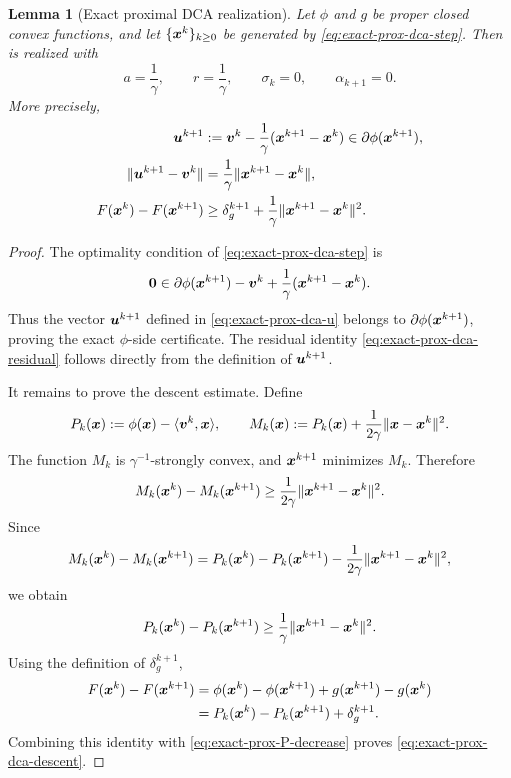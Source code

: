\documentclass[english]{article}
\newtheorem{lemma}{Lemma}[section]
\begin{document}
\begin{lemma}[Exact proximal DCA realization]
\label{lem:exact-prox-dca-realization}
Let $\phi$ and $g$ be proper closed convex functions, and let
$\{\bm{x}^k\}_{k\ge0}$ be generated by
\eqref{eq:exact-prox-dca-step}. Then
 is realized with
\[
    a=\frac{1}{\gamma},
    \qquad
    r=\frac{1}{\gamma},
    \qquad
    \sigma_k=0,
    \qquad
    \alpha_{k+1}=0 .
\]
More precisely,
\begin{align}
    \bm{u}^{k+1}
    &:=
    \bm{v}^k-\frac{1}{\gamma}(\bm{x}^{k+1}-\bm{x}^k)
    \in
    \partial\phi(\bm{x}^{k+1}),
    \label{eq:exact-prox-dca-u}
    \\
    \|\bm{u}^{k+1}-\bm{v}^k\|
    &=
    \frac{1}{\gamma}\|\bm{x}^{k+1}-\bm{x}^k\|,
    \label{eq:exact-prox-dca-residual}
    \\
    F(\bm{x}^k)-F(\bm{x}^{k+1})
    &\ge
    \delta_g^{k+1}
    +
    \frac{1}{\gamma}\|\bm{x}^{k+1}-\bm{x}^k\|^2 .
    \label{eq:exact-prox-dca-descent}
\end{align}
\end{lemma}

\begin{proof}
The optimality condition of \eqref{eq:exact-prox-dca-step} is
\[
    \bm{0}
    \in
    \partial\phi(\bm{x}^{k+1})
    -
    \bm{v}^k
    +
    \frac{1}{\gamma}(\bm{x}^{k+1}-\bm{x}^k).
\]
Thus the vector $\bm{u}^{k+1}$ defined in
\eqref{eq:exact-prox-dca-u} belongs to
$\partial\phi(\bm{x}^{k+1})$, proving the exact $\phi$-side certificate.
The residual identity \eqref{eq:exact-prox-dca-residual} follows
directly from the definition of $\bm{u}^{k+1}$.

It remains to prove the descent estimate. Define
\[
    P_k(\bm{x}):=\phi(\bm{x})-\langle\bm{v}^k,\bm{x}\rangle,
    \qquad
    M_k(\bm{x}):=
    P_k(\bm{x})+\frac{1}{2\gamma}\|\bm{x}-\bm{x}^k\|^2 .
\]
The function $M_k$ is $\gamma^{-1}$-strongly convex, and
$\bm{x}^{k+1}$ minimizes $M_k$. Therefore
\[
    M_k(\bm{x}^k)-M_k(\bm{x}^{k+1})
    \ge
    \frac{1}{2\gamma}\|\bm{x}^{k+1}-\bm{x}^k\|^2 .
\]
Since
\[
    M_k(\bm{x}^k)-M_k(\bm{x}^{k+1})
    =
    P_k(\bm{x}^k)-P_k(\bm{x}^{k+1})
    -
    \frac{1}{2\gamma}\|\bm{x}^{k+1}-\bm{x}^k\|^2,
\]
we obtain
\begin{equation}
    P_k(\bm{x}^k)-P_k(\bm{x}^{k+1})
    \ge
    \frac{1}{\gamma}\|\bm{x}^{k+1}-\bm{x}^k\|^2 .
    \label{eq:exact-prox-P-decrease}
\end{equation}
Using the definition of $\delta_g^{k+1}$,
\[
\begin{aligned}
    F(\bm{x}^k)-F(\bm{x}^{k+1})
    &=
    \phi(\bm{x}^k)-\phi(\bm{x}^{k+1})
    +
    g(\bm{x}^{k+1})-g(\bm{x}^k)
    \\
    &=
    P_k(\bm{x}^k)-P_k(\bm{x}^{k+1})
    +
    \delta_g^{k+1}.
\end{aligned}
\]
Combining this identity with \eqref{eq:exact-prox-P-decrease} proves
\eqref{eq:exact-prox-dca-descent}.
\end{proof}
\end{document}
